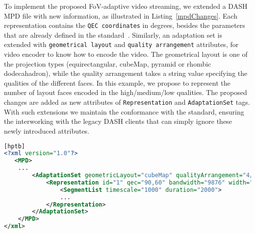

 To implement the proposed FoV-adaptive video streaming, we extended a DASH \ac{MPD} file with new information, as illustrated in Listing~\ref{mpdChanges}. Each representation contains the \texttt{QEC coordinates} in degrees, besides the parameters that are already defined in the standard~\cite{iso_iec}. Similarly, an adaptation set is extended with \texttt{geometrical layout} and \texttt{quality arrangement} attributes, for video encoder to know how to encode the video. The geometrical layout is one of the projection types (equirectangular, cubeMap, pyramid or rhombic dodecahadron), while the quality arrangement takes a string value specifying the qualities of the different faces. In this example, we propose to represent the number of layout faces encoded in the high/medium/low qualities. The proposed changes are added as new attributes of \texttt{Representation} and \texttt{AdaptationSet} tags. With such extensions we maintain the conformance with the standard, ensuring the interworking with the legacy DASH clients that can simply ignore these newly introduced attributes.

\begin{lstlisting}[language=xml, frame=single, backgroundcolor=\color{white}, caption=Extensions of MPD file, label=mpdChanges][hptb]
<?xml version="1.0"?>
   <MPD>
    ...
        <AdaptationSet geometricLayout="cubeMap" qualityArrangement="4/1/1">
            <Representation id="1" qec="90,60" bandwidth="9876" width="1920" height="1080" frameRate="30">
                <SegmentList timescale="1000" duration="2000">
                ...
            </Representation>
        </AdaptationSet>
    </MPD>
</xml>
\end{lstlisting}




